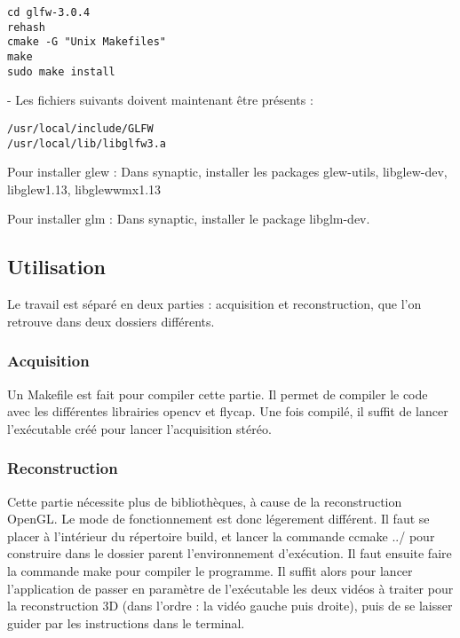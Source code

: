 \begin{verbatim}
cd glfw-3.0.4
rehash
cmake -G "Unix Makefiles"
make
sudo make install
\end{verbatim}

- Les fichiers suivants doivent maintenant être présents :

\begin{verbatim}
/usr/local/include/GLFW
/usr/local/lib/libglfw3.a
\end{verbatim}

Pour installer glew :
Dans synaptic, installer les packages glew-utils, libglew-dev, libglew1.13, libglewwmx1.13

Pour installer glm :
Dans synaptic, installer le package libglm-dev.

\subsection{Utilisation}

Le travail est séparé en deux parties : acquisition et reconstruction, que l'on retrouve dans deux dossiers différents.

\subsubsection{Acquisition}

Un Makefile est fait pour compiler cette partie. Il permet de compiler le code avec les différentes librairies opencv et flycap. Une fois compilé, il suffit de lancer l'exécutable créé pour lancer l'acquisition stéréo.

\subsubsection{Reconstruction}

Cette partie nécessite plus de bibliothèques, à cause de la reconstruction OpenGL. Le mode de fonctionnement est donc légerement différent. Il faut se placer à l'intérieur du répertoire build, et lancer la commande ccmake ../ pour construire dans le dossier parent l'environnement d'exécution. Il faut ensuite faire la commande make pour compiler le programme. Il suffit alors pour lancer l'application de passer en paramètre de l'exécutable les deux vidéos à traiter pour la reconstruction 3D (dans l'ordre : la vidéo gauche puis droite), puis de se laisser guider par les instructions dans le terminal.

